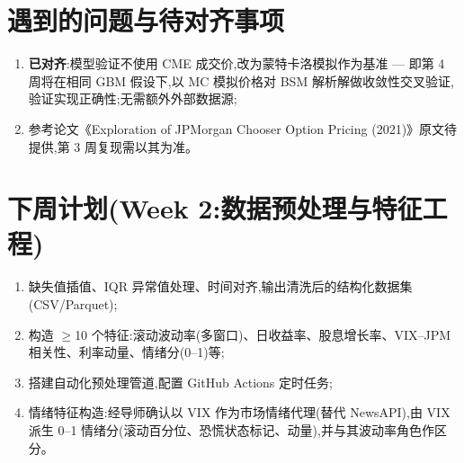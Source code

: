 \documentclass[11pt]{ctexart}
\begin{document}
\section{遇到的问题与待对齐事项}
\begin{enumerate}
  \item \textbf{已对齐}:模型验证不使用 CME 成交价,改为蒙特卡洛模拟作为基准 --- 即第 4 周将在相同 GBM 假设下,以 MC 模拟价格对 BSM 解析解做收敛性交叉验证,验证实现正确性;无需额外外部数据源;
  \item 参考论文《Exploration of JPMorgan Chooser Option Pricing (2021)》原文待提供,第 3 周复现需以其为准。
\end{enumerate}

\section{下周计划(Week 2:数据预处理与特征工程)}
\begin{enumerate}
  \item 缺失值插值、IQR 异常值处理、时间对齐,输出清洗后的结构化数据集(CSV/Parquet);
  \item 构造 $\geq$10 个特征:滚动波动率(多窗口)、日收益率、股息增长率、VIX--JPM 相关性、利率动量、情绪分(0--1)等;
  \item 搭建自动化预处理管道,配置 GitHub Actions 定时任务;
  \item 情绪特征构造:经导师确认以 VIX 作为市场情绪代理(替代 NewsAPI),由 VIX 派生 0--1 情绪分(滚动百分位、恐慌状态标记、动量),并与其波动率角色作区分。
\end{enumerate}
\end{document}
